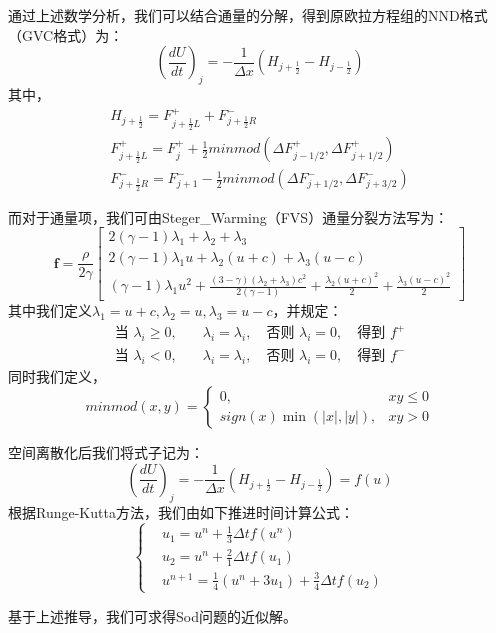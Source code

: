 \documentclass[12pt,a4paper]{article}%
\begin{document}
		通过上述数学分析，我们可以结合通量的分解，得到原欧拉方程组的NND格式（GVC格式）为：
		\[
			(\frac{dU}{dt})_j = -\frac{1}{\Delta x}(H_{j+\frac12} - H_{j-\frac12})
		\]
		其中，
		\begin{gather}
			H_{j+\frac12} = F^{+}_{j+\frac12L} + F^{-}_{j+\frac12R} \\
			F^{+}_{j+\frac12L} = F^+_j + \frac12 minmod(\Delta F^+_{j-1/2},\Delta F^+_{j+1/2}) \\
			F^-_{j+\frac12R} = F^-_{j+1} - \frac12 minmod(\Delta F^-_{j+1/2} , \Delta F^-_{j+3/2})
		\end{gather}
		
		而对于通量项，我们可由Steger\_Warming（FVS）通量分裂方法写为：
		\[
		\mathbf{f} = \frac{\rho}{2\gamma}
		\begin{bmatrix}
			2(\gamma - 1)\lambda_1 + \lambda_2 + \lambda_3 \\
			2(\gamma - 1)\lambda_1 u + \lambda_2 (u + c) + \lambda_3 (u - c) \\
			(\gamma - 1)\lambda_1 u^2 + \frac{(3 - \gamma)(\lambda_2 + \lambda_3)c^2}{2(\gamma - 1)} + \frac{\lambda_2 (u + c)^2}{2} + \frac{\lambda_3 (u - c)^2}{2}
		\end{bmatrix}
		\]
		其中我们定义$\lambda_1=u+c,\lambda_2=u,\lambda_3=u-c$，并规定：
		\[
		\begin{aligned}
			\text{当 } \lambda_i \geq 0,\quad & \lambda_i = \lambda_i,\quad \text{否则 } \lambda_i = 0,\quad \text{得到 } f^+ \\
			\text{当 } \lambda_i < 0,\quad & \lambda_i = \lambda_i,\quad \text{否则 } \lambda_i = 0,\quad \text{得到 } f^-
		\end{aligned}
		\]
		同时我们定义，
		\[
			minmod(x,y) = 
			\begin{cases}
				0, & xy \leq 0 \\
				sign(x)\min(|x|,|y|), & xy>0
			\end{cases}
		\]
		
		空间离散化后我们将式子记为：
		\[
			(\frac{dU}{dt})_j = -\frac{1}{\Delta x}(H_{j+\frac12} - H_{j-\frac12}) = f(u)
		\]
		根据Runge-Kutta方法，我们由如下推进时间计算公式：
		\[
		\left\{
			\begin{aligned}
				& u_1 = u^n + \frac13 \Delta t f(u^n) \\
				& u_2 = u^n + \frac21 \Delta t f(u_1) \\
				& u^{n+1} = \frac14 (u^n+3u_1) + \frac34 \Delta t f(u_2)
			\end{aligned}
		\right.
		\]
		
		基于上述推导，我们可求得Sod问题的近似解。
		
\end{document}
